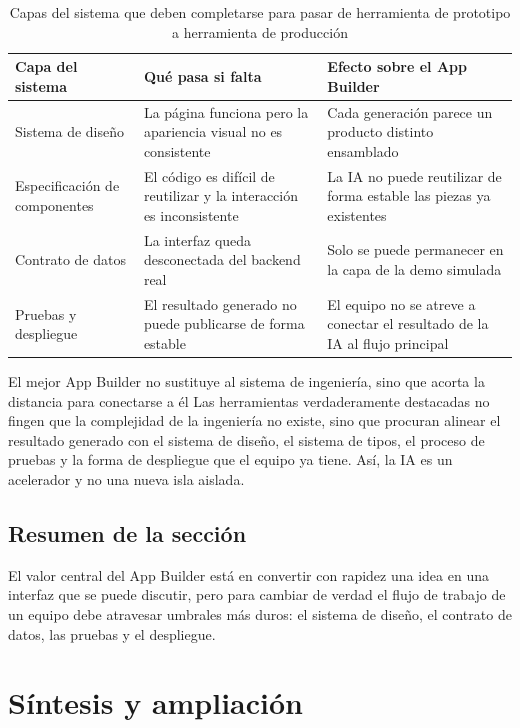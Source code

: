 \documentclass[a4paper]{article}
\begin{document}
\begin{table}[H]
\centering
\begin{tabular}{p{} p{} p{}}
\toprule
Capa del sistema & Qué pasa si falta & Efecto sobre el App Builder \\
\midrule
Sistema de diseño & La página funciona pero la apariencia visual no es consistente & Cada generación parece un producto distinto ensamblado \\
Especificación de componentes & El código es difícil de reutilizar y la interacción es inconsistente & La IA no puede reutilizar de forma estable las piezas ya existentes \\
Contrato de datos & La interfaz queda desconectada del backend real & Solo se puede permanecer en la capa de la demo simulada \\
Pruebas y despliegue & El resultado generado no puede publicarse de forma estable & El equipo no se atreve a conectar el resultado de la IA al flujo principal \\
\bottomrule
\end{tabular}
\caption{Capas del sistema que deben completarse para pasar de herramienta de prototipo a herramienta de producción}
\end{table}

\begin{knowledgebox}{El mejor App Builder no sustituye al sistema de ingeniería, sino que acorta la distancia para conectarse a él}
Las herramientas verdaderamente destacadas no fingen que la complejidad de la ingeniería no existe, sino que procuran alinear el resultado generado con el sistema de diseño, el sistema de tipos, el proceso de pruebas y la forma de despliegue que el equipo ya tiene. Así, la IA es un acelerador y no una nueva isla aislada.
\end{knowledgebox}

\subsection{Resumen de la sección}

El valor central del App Builder está en convertir con rapidez una idea en una interfaz que se puede discutir, pero para cambiar de verdad el flujo de trabajo de un equipo debe atravesar umbrales más duros: el sistema de diseño, el contrato de datos, las pruebas y el despliegue.

\section{Síntesis y ampliación}
\end{document}
